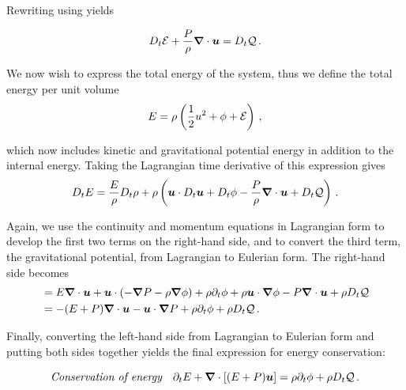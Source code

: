 Rewriting using  yields
\begin{boxedeq}
    \begin{equation}
        D_t \mathcal{E} + \frac{P}{\rho} \boldsymbol{\nabla} \cdot \boldsymbol{u} = D_t \mathcal{Q} \,\mathrm{.}
    \end{equation}
\end{boxedeq}

We now wish to express the total energy of the system, thus we define the total energy per unit volume
\begin{equation}
    E = \rho \left(\frac{1}{2} u^2 + \phi + \mathcal{E} \right) \,\mathrm{,}
\end{equation}

which now includes kinetic and gravitational potential energy in addition to the internal energy. Taking the Lagrangian time derivative of this expression gives
\begin{equation}
    D_t E = \frac{E}{\rho} D_t \rho + \rho \left( \boldsymbol{u} \cdot D_t \boldsymbol{u} + D_t \phi - \frac{P}{\rho} \boldsymbol{\nabla} \cdot \boldsymbol{u} + D_t \mathcal{Q} \right) \,\mathrm{.}
\end{equation}

Again, we use the continuity and momentum equations in Lagrangian form to develop the first two terms on the right-hand side, and  to convert the third term, the gravitational potential, from Lagrangian to Eulerian form. The right-hand side becomes
\begin{align}
    & = E \boldsymbol{\nabla} \cdot \boldsymbol{u} + \boldsymbol{u} \cdot (-\boldsymbol{\nabla} P - \rho \boldsymbol{\nabla} \phi) + \rho \partial_t \phi + \rho \boldsymbol{u} \cdot \boldsymbol{\nabla} \phi - P \boldsymbol{\nabla} \cdot \boldsymbol{u} + \rho D_t \mathcal{Q} \nonumber \\
    & = -(E + P)\boldsymbol{\nabla} \cdot \boldsymbol{u} - \boldsymbol{u} \cdot \boldsymbol{\nabla} P + \rho \partial_t \phi + \rho D_t \mathcal{Q} \,\mathrm{.}
\end{align}

Finally, converting the left-hand side from Lagrangian to Eulerian form and putting both sides together yields the final expression for energy conservation:
\begin{boxedeq}
    \begin{equation}
        \textit{Conservation of energy} \quad \partial_t E + \boldsymbol{\nabla} \cdot \left[ (E + P) \boldsymbol{u} \right] = \rho \partial_t \phi + \rho D_t \mathcal{Q} \,\mathrm{.}
    \end{equation}
\end{boxedeq}

